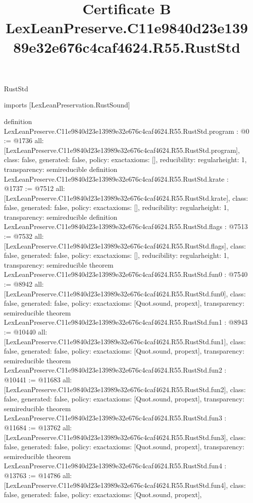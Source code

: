 \begin{lexlean}{RustStd}
\title{Certificate B LexLeanPreserve.C11e9840d23e13989e32e676c4caf4624.R55.RustStd}
\begin{coremodule}
imports [LexLeanPreservation.RustSound]

definition LexLeanPreserve.C11e9840d23e13989e32e676c4caf4624.R55.RustStd.program : @0 := @1736 {
  all: [LexLeanPreserve.C11e9840d23e13989e32e676c4caf4624.R55.RustStd.program],
  class: false,
  generated: false,
  policy: exact{axioms: []},
  reducibility: regular{height: 1},
  transparency: semireducible
}
definition LexLeanPreserve.C11e9840d23e13989e32e676c4caf4624.R55.RustStd.krate : @1737 := @7512 {
  all: [LexLeanPreserve.C11e9840d23e13989e32e676c4caf4624.R55.RustStd.krate],
  class: false,
  generated: false,
  policy: exact{axioms: []},
  reducibility: regular{height: 1},
  transparency: semireducible
}
definition LexLeanPreserve.C11e9840d23e13989e32e676c4caf4624.R55.RustStd.flags : @7513 := @7532 {
  all: [LexLeanPreserve.C11e9840d23e13989e32e676c4caf4624.R55.RustStd.flags],
  class: false,
  generated: false,
  policy: exact{axioms: []},
  reducibility: regular{height: 1},
  transparency: semireducible
}
theorem LexLeanPreserve.C11e9840d23e13989e32e676c4caf4624.R55.RustStd.fun0 : @7540 := @8942 {
  all: [LexLeanPreserve.C11e9840d23e13989e32e676c4caf4624.R55.RustStd.fun0],
  class: false,
  generated: false,
  policy: exact{axioms: [Quot.sound, propext]},
  transparency: semireducible
}
theorem LexLeanPreserve.C11e9840d23e13989e32e676c4caf4624.R55.RustStd.fun1 : @8943 := @10440 {
  all: [LexLeanPreserve.C11e9840d23e13989e32e676c4caf4624.R55.RustStd.fun1],
  class: false,
  generated: false,
  policy: exact{axioms: [Quot.sound, propext]},
  transparency: semireducible
}
theorem LexLeanPreserve.C11e9840d23e13989e32e676c4caf4624.R55.RustStd.fun2 : @10441 := @11683 {
  all: [LexLeanPreserve.C11e9840d23e13989e32e676c4caf4624.R55.RustStd.fun2],
  class: false,
  generated: false,
  policy: exact{axioms: [Quot.sound, propext]},
  transparency: semireducible
}
theorem LexLeanPreserve.C11e9840d23e13989e32e676c4caf4624.R55.RustStd.fun3 : @11684 := @13762 {
  all: [LexLeanPreserve.C11e9840d23e13989e32e676c4caf4624.R55.RustStd.fun3],
  class: false,
  generated: false,
  policy: exact{axioms: [Quot.sound, propext]},
  transparency: semireducible
}
theorem LexLeanPreserve.C11e9840d23e13989e32e676c4caf4624.R55.RustStd.fun4 : @13763 := @14786 {
  all: [LexLeanPreserve.C11e9840d23e13989e32e676c4caf4624.R55.RustStd.fun4],
  class: false,
  generated: false,
  policy: exact{axioms: [Quot.sound, propext]},
}
\end{coremodule}
\end{lexlean}
